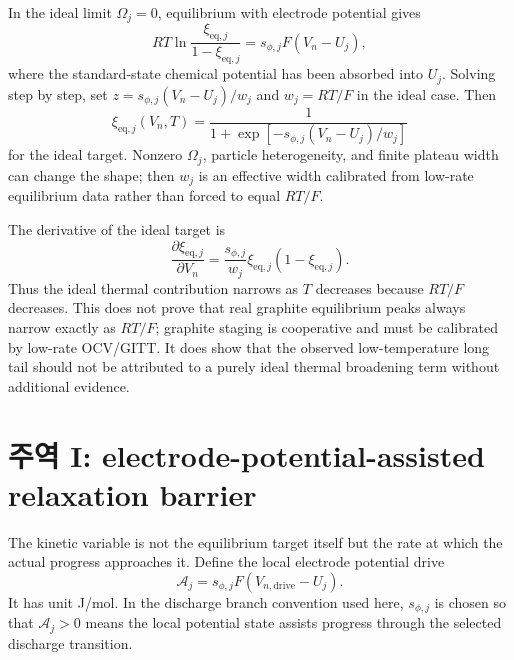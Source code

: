 \documentclass[11pt,a4paper]{article}
\newcommand{\eq}{\mathrm{eq}}
\newcommand{\drive}{\mathrm{drive}}
\begin{document}
In the ideal limit $\Omega_j=0$, equilibrium with electrode potential gives
\begin{equation}
RT\ln\frac{\xi_{\eq,j}}{1-\xi_{\eq,j}}=s_{\phi,j}F(V_n-U_j),
\label{eq:eq_balance}
\end{equation}
where the standard-state chemical potential has been absorbed into $U_j$. Solving step by step, set
$z=s_{\phi,j}(V_n-U_j)/w_j$ and $w_j=RT/F$ in the ideal case. Then
\begin{equation}
\boxed{\;\xi_{\eq,j}(V_n,T)=\frac{1}{1+\exp[-s_{\phi,j}(V_n-U_j)/w_j]}\;}
\label{eq:logistic}
\end{equation}
for the ideal target. Nonzero $\Omega_j$, particle heterogeneity, and finite plateau width can change the shape; then $w_j$ is an effective
width calibrated from low-rate equilibrium data rather than forced to equal $RT/F$.

The derivative of the ideal target is
\begin{equation}
\frac{\partial\xi_{\eq,j}}{\partial V_n}=\frac{s_{\phi,j}}{w_j}\xi_{\eq,j}(1-\xi_{\eq,j}).
\label{eq:dxidV}
\end{equation}
Thus the ideal thermal contribution narrows as $T$ decreases because $RT/F$ decreases. This does not prove that real graphite equilibrium
peaks always narrow exactly as $RT/F$; graphite staging is cooperative and must be calibrated by low-rate OCV/GITT. It does show that the
observed low-temperature long tail should not be attributed to a purely ideal thermal broadening term without additional evidence.

\section{주역 I: electrode-potential-assisted relaxation barrier}\label{sec:rate}
The kinetic variable is not the equilibrium target itself but the rate at which the actual progress approaches it. Define the local electrode
potential drive
\begin{equation}
\mathcal A_j=s_{\phi,j}F(V_{n,\drive}-U_j).
\label{eq:Aj}
\end{equation}
It has unit J/mol. In the discharge branch convention used here, $s_{\phi,j}$ is chosen so that $\mathcal A_j>0$ means the local potential
state assists progress through the selected discharge transition.
\end{document}
